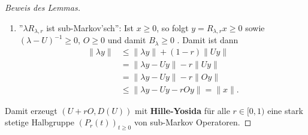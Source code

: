 \begin{proof}[Beweis des Lemmas]
\begin{enumerate}
  \item ''$\lambda R_{\lambda,r}$ ist sub-Markov'sch'':
  Ist $x\geq0$, so folgt $y=R_{\lambda,r}x\geq0$ sowie $(\lambda-U)^{-1}\geq0$, $O\geq0$ und damit $B_\lambda\geq0$ . Damit ist dann 
  \begin{align*}
  \|\lambda y\|&\leq\|\lambda y\|+(1-r)\|Uy\|\\
  &=\|\lambda y-Uy\| - r\|Uy\|\\
  &= \|\lambda y-Uy\|-r\|Oy\|\\
  &\leq\|\lambda y-Uy-rOy\|=\|x\|.\end{align*}
  \end{enumerate} 
  Damit erzeugt $(U+rO, D(U))$ mit \textbf{Hille-Yosida} für alle $r\in[0,1)$ eine stark stetige Halbgruppe $(P_r(t))_{t\geq0}$ von sub-Markov Operatoren. 
\end{proof}


